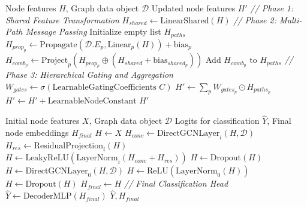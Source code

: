 \documentclass[utf8]{frontiers_suppmat}
\newcommand{\procedurecomment}[1]{\Statex \textit{// #1}}
\begin{document}
\begin{algorithm}[H]
	\caption{$DirectGCN$: Layer Forward Pass}
	\label{alg:DirectGCNLayer}
	\begin{algorithmic}[1]
		\Require Node features $H$, Graph data object $\mathcal{D}$
		\Ensure Updated node features $H'$
		\Statex
		\procedurecomment{Phase 1: Shared Feature Transformation}
		\State $H_{shared} \gets \text{LinearShared}(H)$
		\Statex
		\procedurecomment{Phase 2: Multi-Path Message Passing}
		\State Initialize empty list $H_{paths}$
		\State $H_{prop_p} \gets \text{Propagate}(\mathcal{D}.E_p, \text{Linear}_p(H)) + \text{bias}_p$
		\State $H_{comb_p} \gets \text{Project}_p(H_{prop_p} \oplus (H_{shared} + \text{bias}_{shared_p}))$ 
		\State Add $H_{comb_p}$ to $H_{paths}$
		\EndFor
		\Statex
		\procedurecomment{Phase 3: Hierarchical Gating and Aggregation}
		\State $W_{gates} \gets \sigma(\text{LearnableGatingCoefficients } C)$ 
		\State $H' \gets \sum_{p} W_{gates_p} \odot H_{paths_p}$ 
		\State $H' \gets H' + \text{LearnableNodeConstant}$
		\State \Return $H'$
	\end{algorithmic}
\end{algorithm}

\begin{algorithm}[H]
	\caption{$DirectGCN$: Model Forward Pass}
	\label{alg:DirectGCNModel}
	\begin{algorithmic}[1]
		\Require Initial node features $X$, Graph data object $\mathcal{D}$
		\Ensure Logits for classification $\hat{Y}$, Final node embeddings $H_{final}$
		\Statex
		\State $H \gets X$
		\State $H_{conv} \gets \text{DirectGCNLayer}_i(H, \mathcal{D})$
		\State $H_{res} \gets \text{ResidualProjection}_i(H)$
		\State $H \gets \text{LeakyReLU}(\text{LayerNorm}_i(H_{conv} + H_{res}))$
		\State $H \gets \text{Dropout}(H)$
		\EndFor
		\State $H \gets \text{DirectGCNLayer}_0(H, \mathcal{D})$
		\State $H \gets \text{ReLU}(\text{LayerNorm}_0(H))$
		\State $H \gets \text{Dropout}(H)$
		\EndIf
		\State $H_{final} \gets H$
		\Statex
		\procedurecomment{Final Classification Head}
		\State $\hat{Y} \gets \text{DecoderMLP}(H_{final})$
		\State \Return $\hat{Y}, H_{final}$
	\end{algorithmic}
\end{algorithm}
\end{document}
